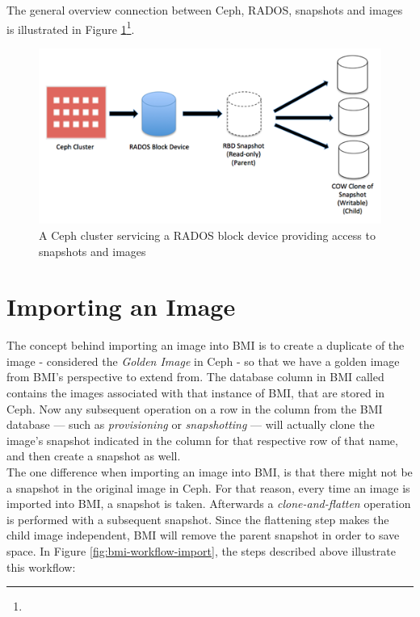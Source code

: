 The general overview connection between Ceph, RADOS, snapshots and images is illustrated in Figure \ref{fig:ceph_rados_snapshot_clone}\footnote{}. \\


\begin{figure}[!h] %
\label{fig:bmi-workflow-import}
\begin{center}
\includegraphics[scale=1]{figures/ceph-rados-snapshot-clone.png}
\end{center}
\caption{A Ceph cluster servicing a RADOS block device providing access to snapshots and images}
\label{fig:ceph_rados_snapshot_clone}
\end{figure}


\section{Importing an Image}

The concept behind importing an image into BMI is to create a duplicate of the image - considered the \emph{Golden Image} in Ceph - so that we have a golden image from BMI's perspective to extend from.  The database column in BMI called  contains the images associated with that instance of BMI, that are stored in Ceph.  Now any subsequent operation on a row in the  column from the BMI database --- such as \emph{provisioning} or \emph{snapshotting} --- will actually clone the image's snapshot indicated in the  column for that respective row of that name, and then create a snapshot as well. \\

The one difference when importing an image into BMI, is that there might not be a snapshot in the original image in Ceph.  For that reason, every time an image is imported into BMI, a snapshot is taken.  Afterwards a \emph{clone-and-flatten} operation is performed with a subsequent snapshot.  Since the flattening step makes the child image independent, BMI will remove the parent snapshot in order to save space.  In Figure \ref{fig:bmi-workflow-import}, the steps described above illustrate this workflow: \\ 


